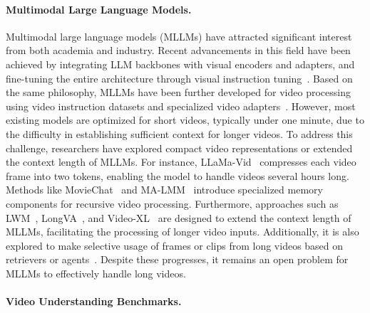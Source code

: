 \paragraph{Multimodal Large Language Models.} Multimodal large language models (MLLMs) have attracted significant interest from both academia and industry. Recent advancements in this field have been achieved by integrating LLM backbones with visual encoders and adapters, and fine-tuning the entire architecture through visual instruction tuning~\cite{llava2023, minigpt4-2023, internvl-1.5-2024}. Based on the same philosophy, MLLMs have been further developed for video processing using video instruction datasets and specialized video adapters~\cite{videollama, videochatgpt2023, videochat2023, mplug-owl-2023, videollava2023, mvbench2023}. However, most existing models are optimized for short videos, typically under one minute, due to the difficulty in establishing sufficient context for longer videos. 
To address this challenge, researchers have explored compact video representations or extended the context length of MLLMs. For instance, LLaMa-Vid~\cite{llama-vid2023} compresses each video frame into two tokens, enabling the model to handle videos several hours long. Methods like MovieChat~\cite{moviechat2023} and MA-LMM~\cite{malmm2024} introduce specialized memory components for recursive video processing. Furthermore, approaches such as LWM~\cite{liu2024world}, LongVA~\cite{zhang2024longva}, and Video-XL~\cite{shu2024videoxl} are designed to extend the context length of MLLMs, facilitating the processing of longer video inputs. Additionally, it is also explored to make selective usage of frames or clips from long videos based on retrievers or agents~\cite{R-VLM-2023, R2A2023, videoagent2024}. Despite these progresses, it remains an open problem for MLLMs to effectively handle long videos. 

 

\vspace{-10pt}

\paragraph{Video Understanding Benchmarks.}
 
